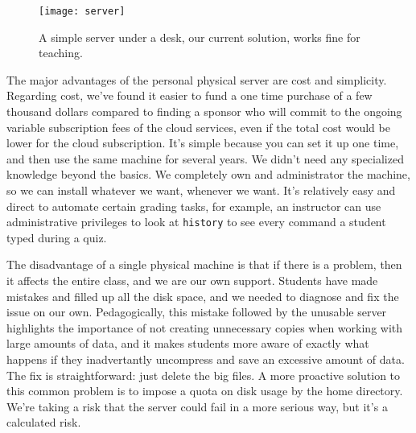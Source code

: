 \documentclass[12pt]{article}
\begin{document}
\begin{figure}[h]
    \centering
    \texttt{[image: server]}
    \caption{A simple server under a desk, our current solution, works fine for teaching.}
    \label{fig:server}
\end{figure}

The major advantages of the personal physical server are cost and simplicity.
Regarding cost, we've found it easier to fund a one time purchase of a few thousand dollars compared to finding a sponsor who will commit to the ongoing variable subscription fees of the cloud services, even if the total cost would be lower for the cloud subscription.
It's simple because you can set it up one time, and then use the same machine for several years.
We didn't need any specialized knowledge beyond the basics.
We completely own and administrator the machine, so we can install whatever we want, whenever we want.
It's relatively easy and direct to automate certain grading tasks, for example, an instructor can use administrative privileges to look at \texttt{history} to see every command a student typed during a quiz.

The disadvantage of a single physical machine is that if there is a problem, then it affects the entire class, and we are our own support.
Students have made mistakes and filled up all the disk space, and we needed to diagnose and fix the issue on our own.
Pedagogically, this mistake followed by the unusable server highlights the importance of not creating unnecessary copies when working with large amounts of data, and it makes students more aware of exactly what happens if they inadvertantly uncompress and save an excessive amount of data.
The fix is straightforward: just delete the big files.
A more proactive solution to this common problem is to impose a quota on disk usage by the home directory.
We're taking a risk that the server could fail in a more serious way, but it's a calculated risk.

\end{document}
